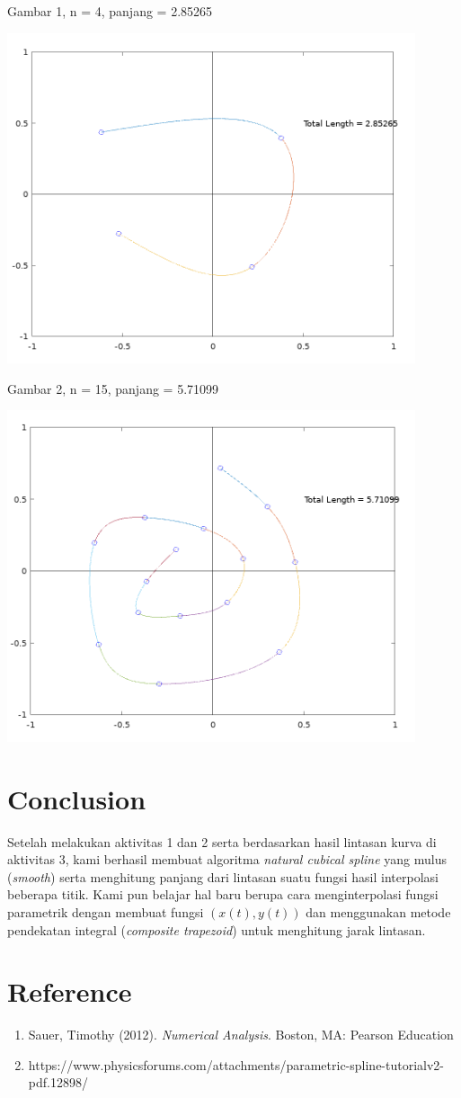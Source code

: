 \documentclass[11pt]{article}
\begin{document}
\begin{center}
Gambar 1, n = 4, panjang = 2.85265

\includegraphics[width=12cm]{hasil1.png}

Gambar 2, n = 15, panjang = 5.71099

\includegraphics[width=12cm]{hasil2.png}

\end{center}

\section{Conclusion}

Setelah melakukan aktivitas 1 dan 2 serta berdasarkan hasil lintasan kurva di aktivitas 3, kami berhasil membuat algoritma \textit{natural cubical spline} yang mulus (\textit{smooth}) serta menghitung panjang dari lintasan suatu fungsi hasil interpolasi beberapa titik. Kami pun belajar hal baru berupa cara menginterpolasi fungsi parametrik dengan membuat fungsi $(x(t),y(t))$ dan menggunakan metode pendekatan integral (\textit{composite trapezoid}) untuk menghitung jarak lintasan.

\section{Reference}
\begin{enumerate}
    \item Sauer, Timothy (2012). \textit{Numerical Analysis}. Boston, MA: Pearson Education
    \item https://www.physicsforums.com/attachments/parametric-spline-tutorialv2-pdf.12898/
\end{enumerate}
\end{document}

